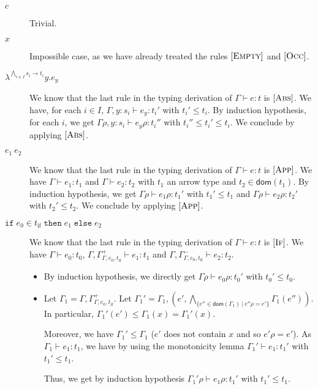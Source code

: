 \documentclass[a4paper]{article}%
\newcommand{\dom}[1]{\textsf{dom}(#1)}
\newcommand{\alt}{~|~}
\newcommand{\ite}[4]{\ensuremath{\texttt{if}\;#1\in#2\;\texttt{then}\;#3\;\texttt{else}\;#4}}
\theoremstyle{definition}
\newcommand {\Rule}[1] {[\textsc{#1}]}
\begin{document}
    \begin{description}
      \item[$c$] Trivial.
      \item[$x$] Impossible case, as we have already treated the rules $\Rule{Empty}$ and $\Rule{Occ}$.
      \item[$\lambda^{\bigwedge_{i\in I} s_i \rightarrow t_i}y.e_y$]
      We know that the last rule in the typing derivation of $\Gamma \vdash e:t$ is $\Rule {Abs}$.
      We have, for each $i \in I$, $\Gamma,y:s_i \vdash e_y:t_i'$ with $t_i'\leq t_i$.
      By induction hypothesis, for each $i$, we get  $\Gamma\rho,y:s_i \vdash e_y\rho:t_i''$ with $t_i''\leq t_i'\leq t_i$. We conclude by applying $\Rule {Abs}$.
      \item[$e_1\ e_2$] We know that the last rule in the typing derivation of $\Gamma \vdash e:t$ is $\Rule {App}$.
      We have $\Gamma\vdash e_1:t_1$ and $\Gamma\vdash e_2:t_2$ with $t_1$ an arrow type and $t_2 \in \dom {t_1}$.
      By induction hypothesis, we get $\Gamma\rho\vdash e_1\rho:t_1'$ with $t_1' \leq t_1$ and $\Gamma\rho\vdash e_2\rho:t_2'$ with $t_2' \leq t_2$. We conclude by applying $\Rule {App}$.
      \item[$\ite {e_0} {t_{\text{if}}} {e_1}{e_2}$] We know that the last rule in the typing derivation of $\Gamma \vdash e:t$ is $\Rule {If}$.
      We have $\Gamma\vdash e_0:t_0$, $\Gamma,\Gamma^+_{\Gamma,e_0,t_{\text{if}}}\vdash e_1 : t_1$ and $\Gamma,\Gamma^-_{\Gamma,e_0,t_{\text{if}}}\vdash e_2 : t_2$.
      \begin{itemize}
        \item By induction hypothesis, we directly get $\Gamma\rho\vdash e_0\rho:t_0'$ with $t_0'\leq t_0$.
        \item Let $\Gamma_1 = \Gamma,\Gamma^+_{\Gamma,e_0,t_{\text{if}}}$. Let $\Gamma_1'=\Gamma_1,(e',\bigwedge_{\{e''\in \dom {\Gamma_1}\alt e''\rho=e'\}} \Gamma_1(e''))$.
        In particular, $\Gamma_1'(e')\leq\Gamma_1(x)=\Gamma_1'(x)$.
        
        Moreover, we have $\Gamma_1' \leq \Gamma_1$ ($e'$ does not contain $x$ and so $e'\rho=e'$).
        As $\Gamma_1 \vdash e_1:t_1$, we have by using the monotonicity lemma $\Gamma_1' \vdash e_1:t_1'$ with $t_1'\leq t_1$.

        Thus, we get by induction hypothesis $\Gamma_1'\rho\vdash e_1\rho:t_1'$ with $t_1' \leq t_1$.


\end{itemize}
\end{description}
\end{document}

